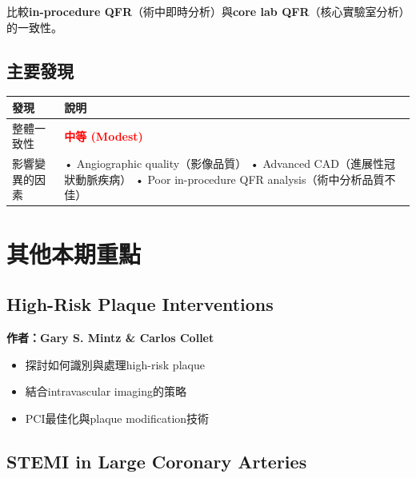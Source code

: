 \documentclass[12pt,a4paper]{article}
\begin{document}
比較\textbf{in-procedure QFR}（術中即時分析）與\textbf{core lab QFR}（核心實驗室分析）的一致性。

\subsection{主要發現}

\begin{longtable}{p{5cm}p{9cm}}
\toprule
\textbf{發現} & \textbf{說明} \\
\midrule
\endfirsthead
\bottomrule
\endfoot

整體一致性 & \textcolor{red}{\textbf{中等 (Modest)}} \\
\midrule
影響變異的因素 & • Angiographic quality（影像品質）\newline
• Advanced CAD（進展性冠狀動脈疾病）\newline
• Poor in-procedure QFR analysis（術中分析品質不佳） \\
\bottomrule
\end{longtable}


\section{其他本期重點}

\subsection{High-Risk Plaque Interventions}

\textbf{作者：Gary S. Mintz \& Carlos Collet}

\begin{itemize}
    \item 探討如何識別與處理high-risk plaque
    \item 結合intravascular imaging的策略
    \item PCI最佳化與plaque modification技術
\end{itemize}

\subsection{STEMI in Large Coronary Arteries}
\end{document}
